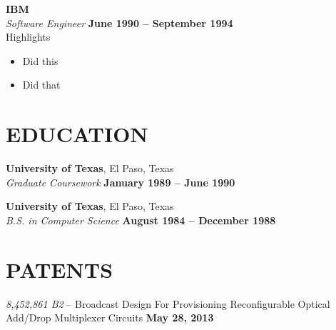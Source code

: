 \documentclass[margin,line]{resume}
\begin{document}
\begin{resume}
    \textbf{\listing IBM} \vspace{2mm}\\\vspace{1mm}%
    \textsl{Software Engineer} \hfill \textbf{June 1990 -- September 1994}\\
    \textsf{\textmd{Highlights}}\\
    \begin{itemize}
      \item Did this
      \item Did that
    \end{itemize}


    \vspace{-1mm}

\sectionline


    \section{\mysidestyle \textbf{\large{E}\small{DUCATION}}}

    \textbf{\listing University of Texas}, El Paso, Texas \vspace{1mm}\\
    \textsl{Graduate Coursework} \hfill \textbf{January 1989 -- June 1990}\vspace{-3mm}\\\vspace{-1mm}%

    \textbf{\listing University of Texas}, El Paso, Texas \vspace{1mm}\\
    \textsl{B.S. in Computer Science} \hfill \textbf{August 1984 -- December 1988}\vspace{-3mm}\\\vspace{-1mm}%

    \vspace{-1mm}

\sectionline

    \section{\mysidestyle \textbf{\large{P}\small{ATENTS}}}
    \textsl{8,452,861 B2} -- Broadcast Design For Provisioning Reconfigurable Optical Add/Drop Multiplexer Circuits \hfill \textbf{May 28, 2013}\\
    \vspace{-4mm}


\end{resume}
\end{document}
